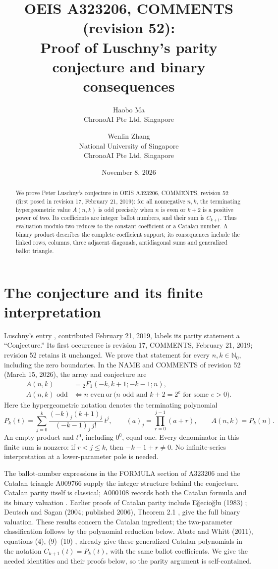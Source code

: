 \documentclass[11pt]{article}
\title{OEIS A323206, COMMENTS (revision 52):\\
  \large Proof of Luschny's parity conjecture and binary consequences}
\author{Haobo Ma\\\small ChronoAI Pte Ltd, Singapore
  \and Wenlin Zhang\\\small National University of Singapore\\
  \small ChronoAI Pte Ltd, Singapore}
\date{November 8, 2026}
\newcommand{\NN}{\mathbb N_0}
\begin{document}
\maketitle
\begin{abstract}
We prove Peter Luschny's conjecture in OEIS A323206, COMMENTS,
revision 52 (first posed in revision 17, February 21, 2019):
for all nonnegative $n,k$, the terminating hypergeometric value $A(n,k)$ is
odd precisely when $n$ is even or $k+2$ is a positive power of two.
Its coefficients are integer ballot numbers, and their sum is $C_{k+1}$.
Thus evaluation modulo two reduces to the constant coefficient or a
Catalan number. A binary product describes the complete coefficient
support; its consequences include the linked rows, columns, three
adjacent diagonals, antidiagonal sums and generalized ballot triangle.
\end{abstract}

\section{The conjecture and its finite interpretation}
Luschny's entry \cite{posing}, contributed February 21, 2019, labels its
parity statement a ``Conjecture.'' Its first occurrence is revision 17,
COMMENTS, February 21, 2019; revision 52 retains it unchanged.
We prove that statement for every
$n,k\in\NN$, including the zero boundaries. In the NAME and COMMENTS of
revision 52 (March 15, 2026), the array and conjecture are
\begin{align}
 A(n,k)&={}_2F_1(-k,k+1;-k-1;n),\label{array}\\
 A(n,k)\text{ odd}&\iff n\text{ even}\ \text{or}\
 \bigl(n\text{ odd and }k+2=2^e\text{ for some }e>0\bigr).\label{conj}
\end{align}
Here the hypergeometric notation denotes the terminating polynomial
\begin{equation}
 P_k(t)=\sum_{j=0}^{k}
   \frac{(-k)_j(k+1)_j}{(-k-1)_j\,j!}\,t^j,
 \qquad (a)_j=\prod_{r=0}^{j-1}(a+r),\qquad A(n,k)=P_k(n).
 \label{finite}
\end{equation}
An empty product and $t^0$, including $0^0$, equal one. Every denominator
in this finite sum is nonzero: if $r<j\le k$, then $-k-1+r\ne0$.
No infinite-series interpretation at a lower-parameter pole is needed.

The ballot-number expressions in the FORMULA section of A323206 and the
Catalan triangle A009766 \cite{ballot} supply the integer structure behind
the conjecture. Catalan parity itself is classical; A000108 records both
the Catalan formula and its binary valuation \cite{catalan}.
Earlier proofs of Catalan parity include E\u{g}ecio\u{g}lu (1983)
\cite{egecioglu}; Deutsch and Sagan (2004; published 2006),
Theorem 2.1 \cite{deutsch}, give the full binary valuation.
These results concern the Catalan ingredient; the two-parameter
classification follows by the polynomial reduction below. Abate and
Whitt (2011), equations (4), (9)--(10) \cite{abate}, already give these
generalized Catalan polynomials in the notation
$C_{k+1}(t)=P_k(t)$, with the same ballot coefficients.
We give the
needed identities and their proofs below, so the parity argument is
self-contained.
\end{document}
